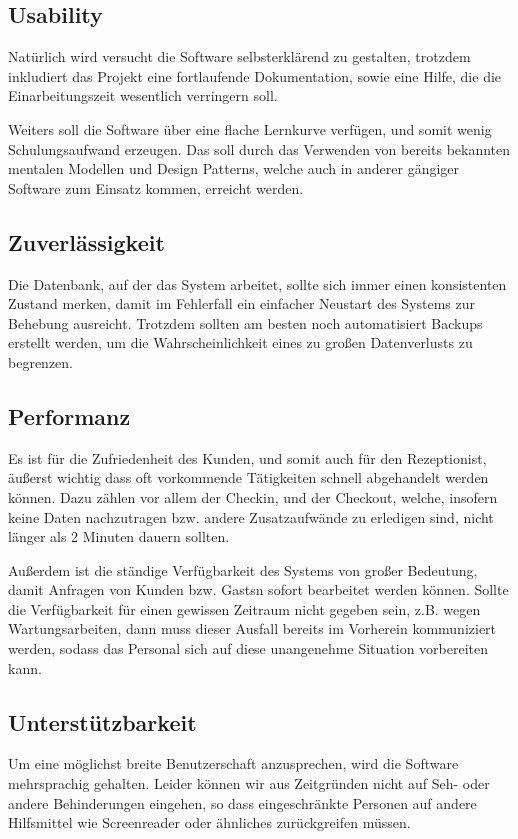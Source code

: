 \documentclass[10pt,a4paper,titlepage]{article}
\begin{document}
\subsection{Usability}
Natürlich wird versucht die Software selbsterklärend zu gestalten, trotzdem inkludiert das Projekt eine fortlaufende Dokumentation, sowie eine Hilfe, die die Einarbeitungszeit wesentlich verringern soll.

Weiters soll die Software über eine flache Lernkurve verfügen, und somit wenig Schulungsaufwand erzeugen. Das soll durch das Verwenden von bereits bekannten mentalen Modellen und Design Patterns, welche auch in anderer gängiger Software zum Einsatz kommen, erreicht werden.
\subsection{Zuverlässigkeit}
Die Datenbank, auf der das System arbeitet, sollte sich immer einen konsistenten Zustand merken, damit im Fehlerfall ein einfacher Neustart des Systems zur Behebung ausreicht. Trotzdem sollten am besten noch automatisiert Backups erstellt werden, um die Wahrscheinlichkeit eines zu großen Datenverlusts zu begrenzen.
\subsection{Performanz}
Es ist für die Zufriedenheit des \Gls{Kunde}n, und somit auch für den \Gls{Rezeptionist}, äußerst wichtig dass oft vorkommende Tätigkeiten schnell abgehandelt werden können. Dazu zählen vor allem der \Gls{Checkin}, und der \Gls{Checkout}, welche, insofern keine Daten nachzutragen bzw. andere Zusatzaufwände zu erledigen sind, nicht länger als 2 Minuten dauern sollten.

Außerdem ist die ständige Verfügbarkeit des Systems von großer Bedeutung, damit Anfragen von \Gls{Kunde}n bzw. \Glspl{Gast}n sofort bearbeitet werden können. Sollte die Verfügbarkeit für einen gewissen Zeitraum nicht gegeben sein, z.B. wegen Wartungsarbeiten, dann muss dieser Ausfall bereits im Vorherein kommuniziert werden, sodass das Personal sich auf diese unangenehme Situation vorbereiten kann.
\subsection{Unterstützbarkeit}
Um eine möglichst breite Benutzerschaft anzusprechen, wird die Software mehrsprachig gehalten. Leider können wir aus Zeitgründen nicht auf Seh- oder andere Behinderungen eingehen, so dass eingeschränkte Personen auf andere Hilfsmittel wie Screenreader oder ähnliches zurückgreifen müssen.
\end{document}
